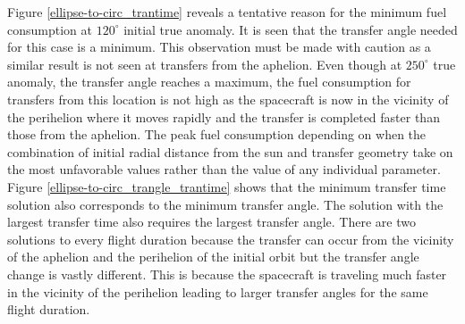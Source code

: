 Figure \ref{ellipse-to-circ_trantime} reveals a tentative reason for the minimum fuel consumption at $120^\circ$ initial true anomaly. It is seen that the transfer angle needed for this case is a minimum. This observation must be made with caution as a similar result is not seen at transfers from the aphelion. Even though at $250^\circ$ true anomaly, the transfer angle reaches a maximum, the fuel consumption for transfers from this location is not high as the spacecraft is now in the vicinity of the perihelion where it moves rapidly and the transfer is completed faster than those from the aphelion. The peak fuel consumption depending on when the combination of initial radial distance from the sun and transfer geometry take on the most unfavorable values rather than the value of any individual parameter. Figure \ref{ellipse-to-circ_trangle_trantime} shows that the minimum transfer time solution also corresponds to the minimum transfer angle. The solution with the largest transfer time also requires the largest  transfer angle. There are two solutions to every flight duration because the transfer can occur from the vicinity of the aphelion and the perihelion of the initial orbit but the transfer angle change is  vastly different. This is because the spacecraft is traveling much faster in the vicinity of the perihelion leading to larger transfer angles for the same flight duration.
